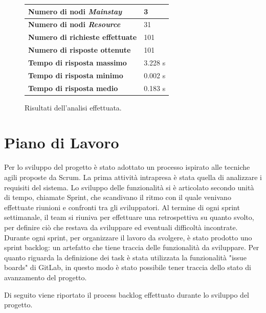 \documentclass{scrartcl}
\begin{document}
\begin{figure}[H]
    \caption{Risultati dell'analisi effettuata.}
    \begin{center}
        \begin{tabular}{ | l | l | }
            \hline
            \textbf{Numero di nodi \textit{Mainstay}} & 3       \\
            \hline
            \textbf{Numero di nodi \textit{Resource}} & 31      \\
            \hline
            \textbf{Numero di richieste effettuate}   & 101     \\
            \hline
            \textbf{Numero di risposte ottenute}      & 101     \\
            \hline
            \textbf{Tempo di risposta massimo}        & 3.228 s \\
            \hline
            \textbf{Tempo di risposta minimo}         & 0.002 s \\
            \hline
            \textbf{Tempo di risposta medio}          & 0.183 s \\
            \hline
        \end{tabular}
    \end{center}
    \label{tab:analysis-specs}
\end{figure}

\section{Piano di Lavoro}

Per lo sviluppo del progetto è stato adottato un processo ispirato alle tecniche agili proposte da Scrum.
La prima attività intrapresa è stata quella di analizzare i requisiti del sistema. Lo sviluppo delle funzionalità si è articolato secondo unità di tempo, chiamate Sprint, che scandivano il ritmo con il quale venivano effettuate riunioni e confronti tra gli sviluppatori. Al termine di ogni sprint settimanale, il team si riuniva per effettuare una retrospettiva su quanto svolto, per definire ciò che restava da sviluppare ed eventuali difficoltà incontrate. Durante ogni sprint, per organizzare il lavoro da svolgere, è stato prodotto uno sprint backlog: un artefatto che tiene traccia delle funzionalità da sviluppare. Per quanto riguarda la definizione dei task è stata utilizzata la funzionalità "issue boards" di GitLab\cite{GitLab}, in questo modo è stato possibile tener traccia dello stato di avanzamento del progetto.

Di seguito viene riportato il process backlog effettuato durante lo sviluppo del progetto.
\end{document}
